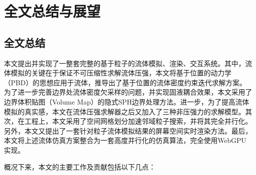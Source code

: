 \section{全文总结与展望}
\subsection{全文总结}
    本文提出并实现了一整套完整的基于粒子的流体模拟、渲染、交互系统。其中，流体模拟的关键在于保证不可压缩性求解流体压强，本文将基于位置的动力学（PBD）的思想应用于流体，推导出了基于位置的流体密度约束迭代求解方案。为了进一步完善边界处流体密度欠采样的问题，并实现固液耦合效果，本文采用了边界体积贴图（Volume Map）的隐式SPH边界处理方法。进一步，为了提高流体模拟的真实感，本文在流体压强求解器之后又加入了三种非压强力的求解模型。其次，在工程上，本文采用了空间网格划分加速邻域粒子搜索，并将其完全并行化。另外，本文又提出了一套针对粒子流体模拟结果的屏幕空间实时渲染方法。最后，本文将上述流体仿真方案整合为一套高度并行化的仿真算法，完全使用WebGPU实现。
    
    概况下来，本文的主要工作及贡献包括以下几点：
    
